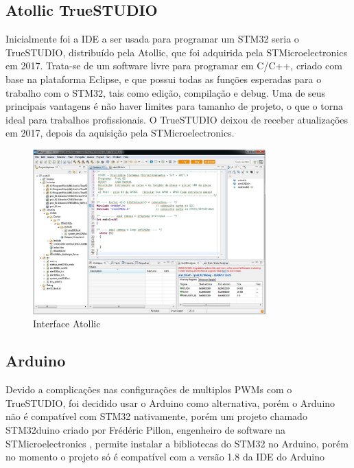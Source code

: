
\subsection{Atollic TrueSTUDIO}

Inicialmente foi a IDE a ser usada para programar um STM32 seria o TrueSTUDIO, distribuído pela
Atollic, que foi adquirida pela STMicroelectronics em 2017. Trata-se de um
software livre para programar em C/C++, criado com base na plataforma Eclipse,
e que possui todas as funções esperadas para o trabalho com o STM32, tais como
edição, compilação e debug. Uma de seus principais vantagens é não haver
limites para tamanho de projeto, o que o torna ideal para trabalhos
profissionais. O TrueSTUDIO deixou de receber atualizações em 2017,
depois da aquisição pela STMicroelectronics.\cite{apostila_microprossados}

\begin{figure}[ht]
	\centering
	\includegraphics[width=0.8\textwidth]{figures/atollic}
	\caption{Interface Atollic \cite{apostila_microprossados}}
\end{figure}


\subsection{Arduino}

Devido a complicações nas configurações de multiplos PWMs com o TrueSTUDIO, foi decidido usar o Arduino como alternativa,
porém o Arduino não é compatível com STM32 nativamente, porém um projeto chamado STM32duino \cite{STM32duino} criado por Frédéric Pillon, engenheiro de software na STMicroelectronics \cite{fpistm},
permite instalar a bibliotecas do STM32 no Arduino, porém no momento o projeto só é compatível com a versão 1.8 da IDE do Arduino

